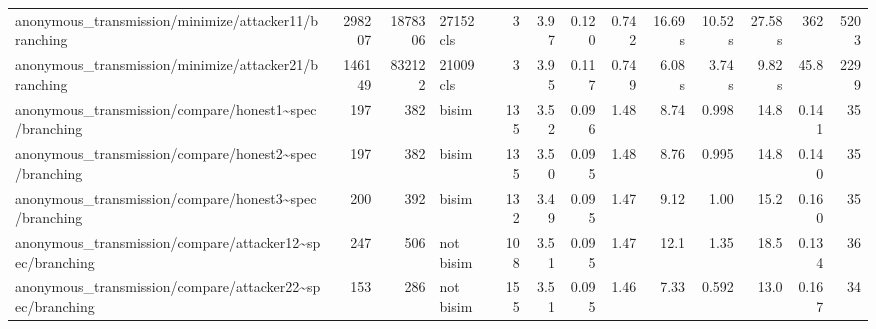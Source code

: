 \begin{tabular}{lrrlrrrrrrrrr}
	anonymous\_transmission/minimize/attacker11/branching                               & 298207 & 1878306 & 27152 cls & 3    & 3.97  & 0.120 & 0.742     & 16.69 s & 10.52 s & 27.58 s & 362   & 5203    \\
	anonymous\_transmission/minimize/attacker21/branching                               & 146149 & 832122  & 21009 cls & 3    & 3.95  & 0.117 & 0.749     & 6.08 s  & 3.74 s  & 9.82 s  & 45.8  & 2299    \\
	anonymous\_transmission/compare/honest1\textasciitilde{}spec/branching              & 197    & 382     & bisim     & 135  & 3.52  & 0.096 & 1.48      & 8.74    & 0.998   & 14.8    & 0.141 & 35      \\
	anonymous\_transmission/compare/honest2\textasciitilde{}spec/branching              & 197    & 382     & bisim     & 135  & 3.50  & 0.095 & 1.48      & 8.76    & 0.995   & 14.8    & 0.140 & 35      \\
	anonymous\_transmission/compare/honest3\textasciitilde{}spec/branching              & 200    & 392     & bisim     & 132  & 3.49  & 0.095 & 1.47      & 9.12    & 1.00    & 15.2    & 0.160 & 35      \\
	anonymous\_transmission/compare/attacker12\textasciitilde{}spec/branching           & 247    & 506     & not bisim & 108  & 3.51  & 0.095 & 1.47      & 12.1    & 1.35    & 18.5    & 0.134 & 36      \\
	anonymous\_transmission/compare/attacker22\textasciitilde{}spec/branching           & 153    & 286     & not bisim & 155  & 3.51  & 0.095 & 1.46      & 7.33    & 0.592   & 13.0    & 0.167 & 34      \\
	\bottomrule
\end{tabular}
